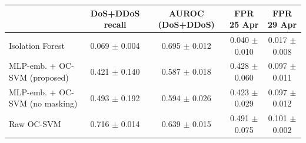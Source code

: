 \begin{tabular}{lcccc}
\toprule
 & DoS+DDoS recall & AUROC (DoS+DDoS) & FPR 25 Apr & FPR 29 Apr \\
\midrule
Isolation Forest & 0.069 $\pm$ 0.004 & 0.695 $\pm$ 0.012 & 0.040 $\pm$ 0.010 & 0.017 $\pm$ 0.008 \\
MLP-emb. + OC-SVM (proposed) & 0.421 $\pm$ 0.140 & 0.587 $\pm$ 0.018 & 0.428 $\pm$ 0.060 & 0.097 $\pm$ 0.011 \\
MLP-emb. + OC-SVM (no masking) & 0.493 $\pm$ 0.192 & 0.594 $\pm$ 0.026 & 0.423 $\pm$ 0.029 & 0.097 $\pm$ 0.012 \\
Raw OC-SVM & 0.716 $\pm$ 0.014 & 0.639 $\pm$ 0.015 & 0.491 $\pm$ 0.075 & 0.101 $\pm$ 0.002 \\
\bottomrule
\end{tabular}